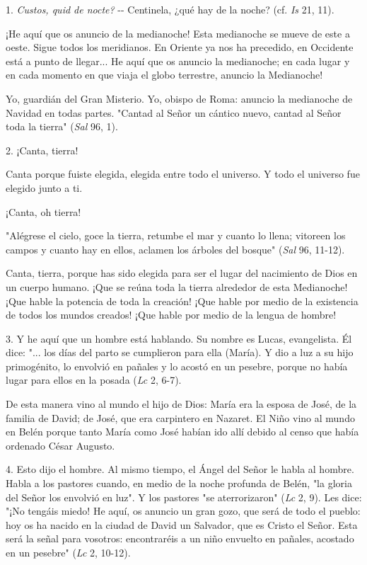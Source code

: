 \begin{body}
\begin{body} 
1. \emph{Custos, quid de nocte?} -\/- Centinela, ¿qué hay de la noche? (cf. \emph{Is} 21, 11).

¡He aquí que os anuncio de la medianoche! Esta medianoche se mueve de este a oeste. Sigue todos los meridianos. En Oriente ya nos ha precedido, en Occidente está a punto de llegar... He aquí que os anuncio la medianoche; en cada lugar y en cada momento en que viaja el globo terrestre, anuncio la Medianoche!

Yo, guardián del Gran Misterio. Yo, obispo de Roma: anuncio la medianoche de Navidad en todas partes. "Cantad al Señor un cántico nuevo, cantad al Señor toda la tierra" (\emph{Sal} 96, 1).

2. ¡Canta, tierra!

Canta porque fuiste elegida, elegida entre todo el universo. Y todo el universo fue elegido junto a ti.

¡Canta, oh tierra!

"Alégrese el cielo, goce la tierra, retumbe el mar y cuanto lo llena; vitoreen los campos y cuanto hay en ellos, aclamen los árboles del bosque" (\emph{Sal} 96, 11-12).

Canta, tierra, porque has sido elegida para ser el lugar del nacimiento de Dios en un cuerpo humano. ¡Que se reúna toda la tierra alrededor de esta Medianoche! ¡Que hable la potencia de toda la creación! ¡Que hable por medio de la existencia de todos los mundos creados! ¡Que hable por medio de la lengua de hombre!

3. Y he aquí que un hombre está hablando. Su nombre es Lucas, evangelista. Él dice: "... los días del parto se cumplieron para ella (María). Y dio a luz a su hijo primogénito, lo envolvió en pañales y lo acostó en un pesebre, porque no había lugar para ellos en la posada (\emph{Lc} 2, 6-7).

De esta manera vino al mundo el hijo de Dios: María era la esposa de José, de la familia de David; de José, que era carpintero en Nazaret. El Niño vino al mundo en Belén porque tanto María como José habían ido allí debido al censo que había ordenado César Augusto.

4. Esto dijo el hombre. Al mismo tiempo, el Ángel del Señor le habla al hombre. Habla a los pastores cuando, en medio de la noche profunda de Belén, "la gloria del Señor los envolvió en luz". Y los pastores "se aterrorizaron" (\emph{Lc} 2, 9). Les dice: "¡No tengáis miedo! He aquí, os anuncio un gran gozo, que será de todo el pueblo: hoy os ha nacido en la ciudad de David un Salvador, que es Cristo el Señor. Esta será la señal para vosotros: encontraréis a un niño envuelto en pañales, acostado en un pesebre" (\emph{Lc} 2, 10-12).


\end{body}
\end{body}
